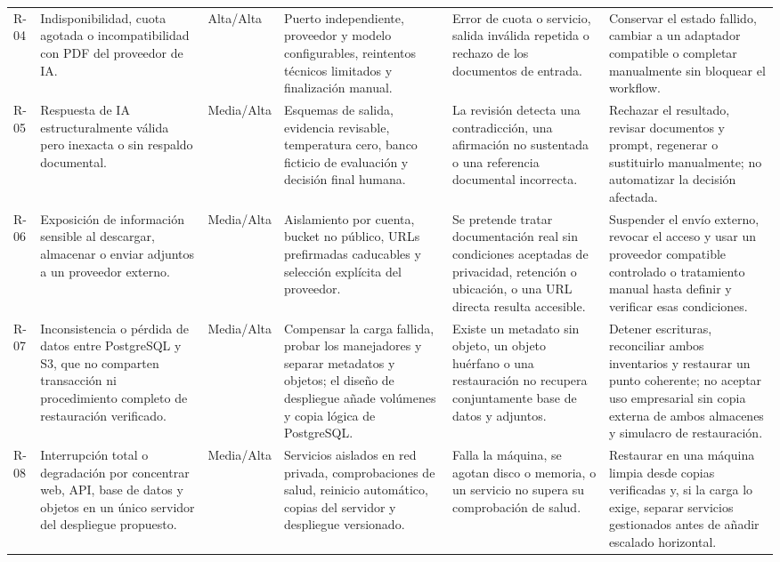 \begin{longtable}{@{}L{1cm}L{2.5cm}L{1.2cm}L{2.85cm}L{2.5cm}L{2.83cm}@{}}
  \mbox{R-04} & Indisponibilidad, cuota agotada o incompatibilidad con PDF del proveedor de IA. & Alta/\newline Alta & Puerto independiente, proveedor y modelo configurables, reintentos técnicos limitados y finalización manual. & Error de cuota o servicio, salida inválida repetida o rechazo de los documentos de entrada. & Conservar el estado fallido, cambiar a un adaptador compatible o completar manualmente sin bloquear el workflow. \\
  \mbox{R-05} & Respuesta de IA estructuralmente válida pero inexacta o sin respaldo documental. & Media/\newline Alta & Esquemas de salida, evidencia revisable, temperatura cero, banco ficticio de evaluación y decisión final humana. & La revisión detecta una contradicción, una afirmación no sustentada o una referencia documental incorrecta. & Rechazar el resultado, revisar documentos y prompt, regenerar o sustituirlo manualmente; no automatizar la decisión afectada. \\
  \mbox{R-06} & Exposición de información sensible al descargar, almacenar o enviar adjuntos a un proveedor externo. & Media/\newline Alta & Aislamiento por cuenta, bucket no público, URLs prefirmadas caducables y selección explícita del proveedor. & Se pretende tratar documentación real sin condiciones aceptadas de privacidad, retención o ubicación, o una URL directa resulta accesible. & Suspender el envío externo, revocar el acceso y usar un proveedor compatible controlado o tratamiento manual hasta definir y verificar esas condiciones. \\
  \mbox{R-07} & Inconsistencia o pérdida de datos entre PostgreSQL y S3, que no comparten transacción ni procedimiento completo de restauración verificado. & Media/\newline Alta & Compensar la carga fallida, probar los manejadores y separar metadatos y objetos; el diseño de despliegue añade volúmenes y copia lógica de PostgreSQL. & Existe un metadato sin objeto, un objeto huérfano o una restauración no recupera conjuntamente base de datos y adjuntos. & Detener escrituras, reconciliar ambos inventarios y restaurar un punto coherente; no aceptar uso empresarial sin copia externa de ambos almacenes y simulacro de restauración. \\
  \mbox{R-08} & Interrupción total o degradación por concentrar web, API, base de datos y objetos en un único servidor del despliegue propuesto. & Media/\newline Alta & Servicios aislados en red privada, comprobaciones de salud, reinicio automático, copias del servidor y despliegue versionado. & Falla la máquina, se agotan disco o memoria, o un servicio no supera su comprobación de salud. & Restaurar en una máquina limpia desde copias verificadas y, si la carga lo exige, separar servicios gestionados antes de añadir escalado horizontal. \\
\end{longtable}
\normalsize

